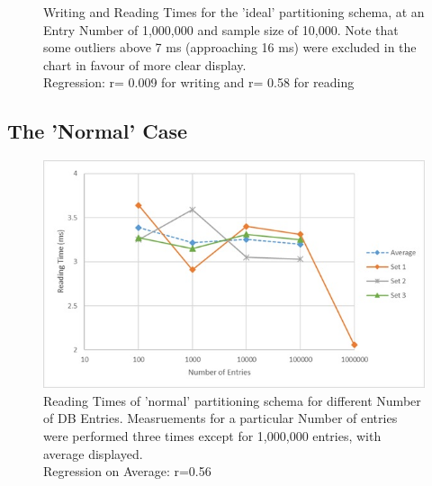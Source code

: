 \documentclass{template/csfourzero}
\begin{document}
  \begin{figure}[H]
      \centering
      \noindent{}
      \caption{Writing and Reading Times for the 'ideal' partitioning schema, at an Entry Number of 1,000,000 and sample size of 10,000. Note that some outliers above 7 ms (approaching 16 ms) were excluded in the chart in favour of more clear display.
      \\
      Regression: r= 0.009 for writing and r= 0.58 for reading
      }
      \label{fig:idealFull}
  \end{figure}
  
  \subsection{The 'Normal' Case}
  
    \begin{figure}[H]
      \centering
      \includegraphics{figures/normalTimes.jpg}
      \caption{Reading Times of 'normal' partitioning schema for different Number of DB Entries. Measruements for a particular Number of entries were performed three times except for 1,000,000 entries, with average displayed.
      \\
      Regression on Average: r=0.56}
      \label{fig:normalTimes}
  \end{figure}
  
\end{document}
